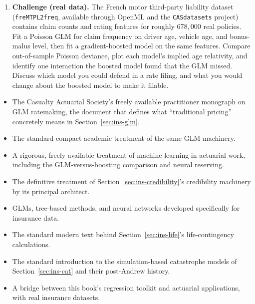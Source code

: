 \documentclass[../ai_in_finance]{subfiles}
\begin{document}
\begin{enumerate}[exercises]
\item \textbf{Challenge (real data).} The French motor third-party liability dataset (\texttt{freMTPL2freq}, available through OpenML and the \texttt{CASdatasets} project) contains claim counts and rating features for roughly $678{,}000$ real policies. Fit a Poisson GLM for claim frequency on driver age, vehicle age, and bonus-malus level, then fit a gradient-boosted model on the same features. Compare out-of-sample Poisson deviance, plot each model's implied age relativity, and identify one interaction the boosted model found that the GLM missed. Discuss which model you could defend in a rate filing, and what you would change about the boosted model to make it filable.
\end{enumerate}


\begin{itemize}
\item {} The Casualty Actuarial Society's freely available practitioner monograph on GLM ratemaking, the document that defines what ``traditional pricing'' concretely means in Section~\ref{sec:ins-glm}.
\item {} The standard compact academic treatment of the same GLM machinery.
\item {} A rigorous, freely available treatment of machine learning in actuarial work, including the GLM-versus-boosting comparison and neural reserving.
\item {} The definitive treatment of Section~\ref{sec:ins-credibility}'s credibility machinery by its principal architect.
\item {} GLMs, tree-based methods, and neural networks developed specifically for insurance data.
\item {} The standard modern text behind Section~\ref{sec:ins-life}'s life-contingency calculations.
\item {} The standard introduction to the simulation-based catastrophe models of Section~\ref{sec:ins-cat} and their post-Andrew history.
\item {} A bridge between this book's regression toolkit and actuarial applications, with real insurance datasets.
\end{itemize}
\end{document}
